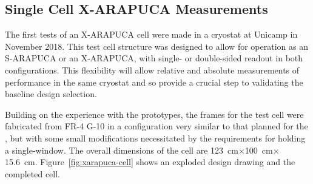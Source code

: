 

\subsection{Single Cell X-ARAPUCA Measurements}
\label{sec:xarapuca-unicamp}

The first tests of an X-ARAPUCA cell were made in a cryostat at Unicamp in November 2018. This test cell structure was designed to allow for operation as an S-ARAPUCA or an X-ARAPUCA, with single- or double-sided readout in both configurations.  This flexibility will allow relative and absolute measurements of performance in the same cryostat and so provide a crucial step to validating the baseline design selection.

Building on the experience with the  prototypes, the frames for the test cell were fabricated from FR-4 G-10 in a configuration very similar to that planned for the , but with some small modifications necessitated by the requirements for holding a single-window. The overall dimensions of the cell are \SI{123}{cm}$\times$\SI{100}{cm}$\times$\SI{15.6}{cm}. Figure~\ref{fig:xarapuca-cell} shows an exploded design drawing and the completed cell. 

